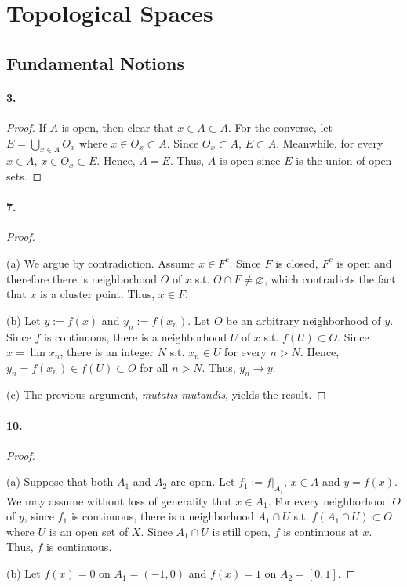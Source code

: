 \section{Topological Spaces}
\subsection{Fundamental Notions}
\paragraph{3.}
\begin{proof}
  If $A$ is open, then clear that $x \in A \subset A$. For the converse, let 
  $E = \bigcup_{x\in A}O_x$ where $x\in O_x \subset A$. Since $O_x\subset A$,
  $E \subset A$. Meanwhile, for every $x\in A$, $x \in O_x\subset E$. Hence, 
  $A = E$. Thus, $A$ is open since $E$ is the union of open sets.
\end{proof}

\paragraph{7.}
\begin{proof}
  $\,$\par
  (a) We argue by contradiction. Assume $x \in F^c$. Since $F$ is closed, $F^c$
  is open and therefore there is neighborhood $O$ of $x$ s.t. $O \cap F
  \ne \varnothing$, which contradicts the fact that $x$ is a cluster point.
  Thus, $x \in F$.
  
  (b) Let $y := f(x)$ and $y_n := f(x_n)$. Let $O$ be an arbitrary
  neighborhood of $y$. Since $f$ is continuous, there is a neighborhood $U$ of
  $x$ s.t. $f(U) \subset O$. Since $x = \lim x_n$, there is an integer $N$ s.t.
  $x_n \in U$ for every $n > N$. Hence, $y_n = f(x_n) \in f(U) \subset O$ for
  all $n > N$. Thus, $y_n \to y$.
  
  (c) The previous argument, \textit{mutatis mutandis}, yields the result.
\end{proof}

\paragraph{10.}
\begin{proof}
  $\,$\par
  (a) Suppose that both $A_1$ and $A_2$ are open.
  Let $f_1 := f|_{A_1}$, $x\in A$ and $y = f(x)$. We may assume without
  loss of generality that $x \in A_1$. For every neighborhood $O$ of $y$, since
  $f_1$ is continuous, there is a neighborhood $A_1\cap U$ s.t. $f(A_1\cap U)
  \subset O$ where $U$ is an open set of $X$. Since $A_1\cap U$ is still open,
  $f$ is continuous at $x$. Thus, $f$ is continuous.
  
  (b) Let $f(x) = 0$ on $A_1 = (-1, 0)$ and $f(x) = 1$ on $A_2 = [0, 1]$.
\end{proof}
